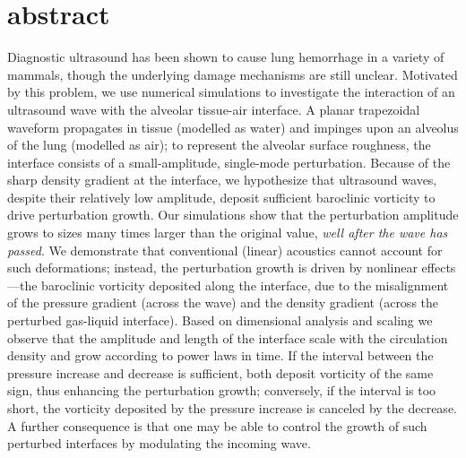\section{abstract}
  Diagnostic ultrasound has been shown to cause lung hemorrhage in a
  variety of mammals, though the underlying damage mechanisms are
  still unclear. Motivated by this problem, we use numerical
  simulations to investigate the interaction of an ultrasound wave
  with the alveolar tissue-air interface. A planar trapezoidal waveform
  propagates in tissue (modelled as water) and
  impinges upon an alveolus of the lung (modelled as air); to
  represent the alveolar surface roughness, the interface consists of a
  small-amplitude, single-mode perturbation. Because of the sharp
  density gradient at the interface, we hypothesize that ultrasound
  waves, despite their relatively low amplitude, deposit sufficient
  baroclinic vorticity to drive perturbation growth. Our simulations
  show that the perturbation amplitude grows to sizes many times
  larger than the original value, \emph{well after the wave has
    passed}. We demonstrate that conventional (linear) acoustics
  cannot account for such deformations; instead, the perturbation
  growth is driven by nonlinear effects---the baroclinic vorticity
  deposited along the interface, due to the misalignment of the
  pressure gradient (across the wave) and the density gradient (across
  the perturbed gas-liquid interface). Based on dimensional analysis
  and scaling we observe that the amplitude and length of the
  interface scale with the circulation density and grow according to
  power laws in time. If the interval between the pressure increase
  and decrease is sufficient, both deposit vorticity of the same sign,
  thus enhancing the perturbation growth; conversely, if the interval
  is too short, the vorticity deposited by the pressure increase is
  canceled by the decrease. A further consequence is that one may be
  able to control the growth of such perturbed interfaces by
  modulating the incoming wave.

